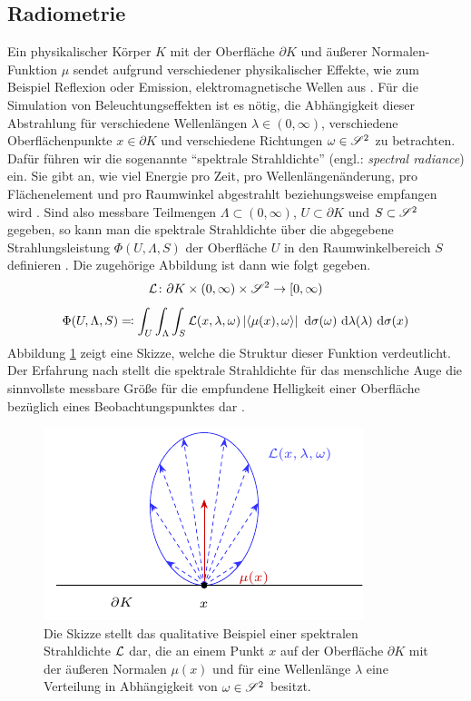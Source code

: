 
	\subsection{Radiometrie} %
	\label{sub:radiometrie}

		Ein physikalischer Körper $K$ mit der Oberfläche $\partial K$ und äußerer Normalen-Funktion $\mu$ sendet aufgrund verschiedener physikalischer Effekte, wie zum Beispiel Reflexion oder Emission, elektromagnetische Wellen aus \cite{nolting-edyn}.
		Für die Simulation von Beleuchtungseffekten ist es nötig, die Abhängigkeit dieser Abstrahlung für verschiedene Wellenlängen $\lambda\in(0,\infty)$, verschiedene Oberflächenpunkte $x\in\partial K$ und verschiedene Richtungen $\omega\in\mathscr{S}^{2}$ zu betrachten.
		Dafür führen wir die sogenannte \enquote{spektrale Strahldichte} (engl.: \textit{spectral radiance}) ein.
		Sie gibt an, wie viel Energie pro Zeit, pro Wellenlängenänderung, pro Flächenelement und pro Raumwinkel abgestrahlt beziehungsweise empfangen wird \cite{intro-radiometry,malacara-colorimetry,ohta-colorimetry}.
		Sind also messbare Teilmengen $\Lambda\subset (0,\infty)$, $U\subset \partial K$ und $S\subset\mathscr{S}^{2}$ gegeben, so kann man die spektrale Strahldichte über die abgegebene Strahlungsleistung $\Phi(U,\Lambda,S)$ der Oberfläche $U$ in den Raumwinkelbereich $S$ definieren \cite{intro-radiometry}.
		Die zugehörige Abbildung ist dann wie folgt gegeben.
		\[
			\mathcal{L}\colon\partial K\times(0,\infty)\times \mathscr{S}^{2}\to[0,\infty)
		\]
		\[
			\Phi(U,\Lambda,S) \eqqcolon \int_{U}^{}  \int_{\Lambda}^{}  \int_{S}^{}  \mathcal{L}(x,\lambda,\omega)\left\vert \left\langle \mu(x),\omega \right\rangle \right\vert \ \mathrm{d} \sigma(\omega) \ \mathrm{d} \lambda(\lambda) \ \mathrm{d} \sigma(x)
		\]
		Abbildung \ref{fig:radiance} zeigt eine Skizze, welche die Struktur dieser Funktion verdeutlicht.
		Der Erfahrung nach stellt die spektrale Strahldichte für das menschliche Auge die sinnvollste messbare Größe für die empfundene Helligkeit einer Oberfläche bezüglich eines Beobachtungspunktes dar \cite{malacara-colorimetry,ohta-colorimetry}.

		\begin{figure}
			\center
			\includegraphics{gg_fig/radiance_1.pdf}
			\caption[Skizzenhaftes Beispiel der Strahldichte]{Die Skizze stellt das qualitative Beispiel einer spektralen Strahldichte $\mathcal{L}$ dar, die an einem Punkt $x$ auf der Oberfläche $\partial K$ mit der äußeren Normalen $\mu(x)$ und für eine Wellenlänge $\lambda$ eine Verteilung in Abhängigkeit von $\omega\in\mathscr{S}^{2}$ besitzt.}
			\label{fig:radiance}
		\end{figure}

